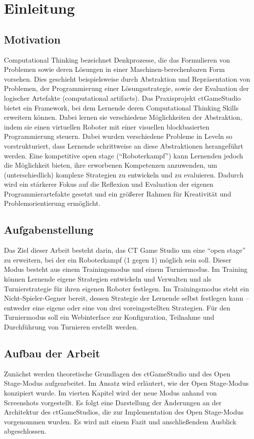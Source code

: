 \chapter{Einleitung}

\section{Motivation}

Computational Thinking bezeichnet Denkprozesse, die das Formulieren von Problemen sowie deren
Lösungen in einer Maschinen-berechenbaren Form vorsehen. Dies geschieht beispielsweise durch
Abstraktion und Repräsentation von Problemen, der Programmierung einer Lösungsstrategie, sowie der
Evaluation der logischer Artefakte (computational artifacts). Das Praxisprojekt ctGameStudio
bietet ein Framework, bei dem Lernende deren Computational Thinking Skills erweitern können. Dabei
lernen sie verschiedene Möglichkeiten der Abstraktion, indem sie einen virtuellen Roboter mit einer
visuellen blockbasierten Programmierung steuern. Dabei wurden verschiedene Probleme in Leveln so
vorstrukturiert, dass Lernende schrittweise an diese Abstraktionen herangeführt werden. Eine
kompetitive open stage (\enquote{Roboterkampf}) kann Lernenden jedoch die Möglichkeit bieten, ihre
erworbenen Kompetenzen anzuwenden, um (unterschiedlich) komplexe Strategien zu entwickeln und zu
evaluieren. Dadurch wird ein stärkerer Fokus auf die Reflexion und Evaluation der eigenen
Programmierartefakte gesetzt und ein größerer Rahmen für Kreativität und Problemorientierung
ermöglicht.

\section{Aufgabenstellung}

Das Ziel dieser Arbeit besteht darin, das CT Game Studio um eine \enquote{open stage} zu erweitern,
bei der ein Roboterkampf (1 gegen 1) möglich sein soll. Dieser Modus besteht aus einem
Trainingsmodus und einem Turniermodus. Im Training können Lernende eigene Strategien
entwickeln und Verwalten und als Turnierstrategie für ihren eigenen Roboter festlegen. Im
Trainingsmodus steht ein Nicht-Spieler-Gegner bereit, dessen Strategie der Lernende selbst festlegen
kann – entweder eine eigene oder eine von drei voreingestellten Strategien. Für den Turniermodus
soll ein Webinterface zur Konfiguration, Teilnahme und Durchführung von Turnieren erstellt werden.

\section{Aufbau der Arbeit}

Zunächst werden theoretische Grundlagen des ctGameStudio und des Open Stage-Modus aufgearbeitet. Im
Ansatz wird erläutert, wie der Open Stage-Modus konzipiert wurde. Im vierten Kapitel wird der neue
Modus anhand von Screenshots vorgestellt. Es folgt eine Darstellung der Änderungen an der
Architektur des ctGameStudios, die zur Implementation des Open Stage-Modus vorgenommen wurden. Es
wird mit einem Fazit und anschließendem Ausblick abgeschlossen.
